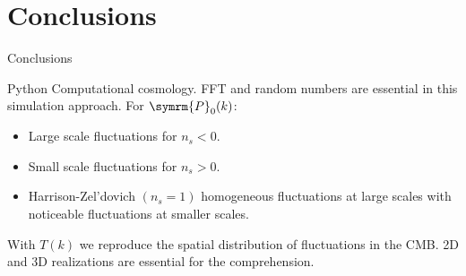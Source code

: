 \section{Conclusions}
\begin{frame}[noframenumbering]{Conclusions}
    \begin{itemize}
        \thusitem Python  Computational cosmology.
        \thusitem FFT and random numbers are essential in this simulation approach.
        \thusitem For \(\symrm{P}_0(k)\):
        \begin{itemize}[label=\filledcircle]
            \item Large scale fluctuations for \(n_s<0\).
            \item Small scale fluctuations for \(n_s>0\).
            \item Harrison-Zel'dovich \((n_s=1)\) homogeneous fluctuations at large scales with noticeable fluctuations at smaller scales.
        \end{itemize}
        \thusitem With \(T(k)\) we reproduce the spatial distribution of fluctuations in the CMB.
        \thusitem 2D and 3D realizations are essential for the comprehension.
    \end{itemize}
\end{frame}
